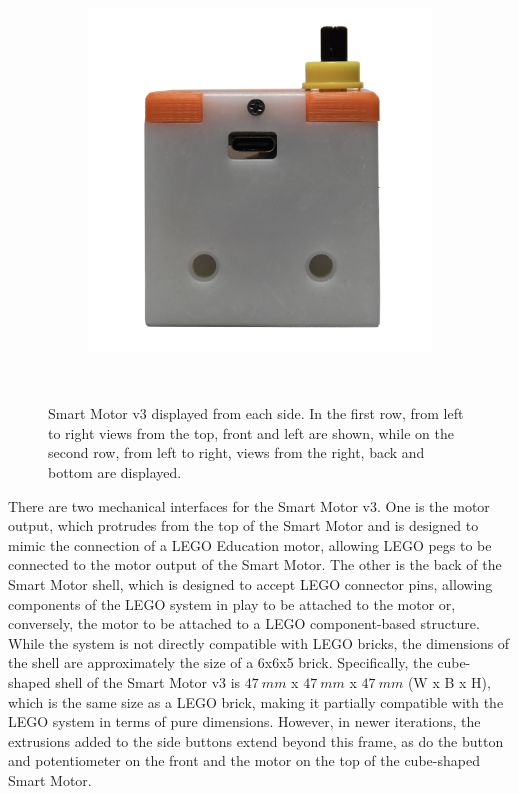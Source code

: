 \begin{figure}[H]
\begin{subfigure}[b]{0.25\textwidth}
    \end{subfigure}
    \begin{subfigure}[b]{0.25\textwidth}
        \includegraphics[width=\linewidth]{overleaf/images/sm_bottom.jpg}
    \end{subfigure}
    \\\vspace{\ftspace}
    \caption{Smart Motor v3 displayed from each side. In the first row, from left to right views from the top, front and left are shown, while on the second row, from left to right, views from the right, back and bottom are displayed.}
    \vspace{\ftspace}
    \label{fig:smv3_hardware}
\end{figure}

There are two mechanical interfaces for the Smart Motor v3. One is the motor output, which protrudes from the top of the Smart Motor and is designed to mimic the connection of a LEGO Education motor, allowing LEGO pegs to be connected to the motor output of the Smart Motor. The other is the back of the Smart Motor shell, which is designed to accept LEGO connector pins, allowing components of the LEGO system in play to be attached to the motor or, conversely, the motor to be attached to a LEGO component-based structure. While the system is not directly compatible with LEGO bricks, the dimensions of the shell are approximately the size of a 6x6x5 brick. Specifically, the cube-shaped shell of the Smart Motor v3 is $47\ mm$ x $47\ mm$ x $47\ mm$ (W x B x H), which is the same size as a LEGO brick, making it partially compatible with the LEGO system in terms of pure dimensions. However, in newer iterations, the extrusions added to the side buttons extend beyond this frame, as do the button and potentiometer on the front and the motor on the top of the cube-shaped Smart Motor.

